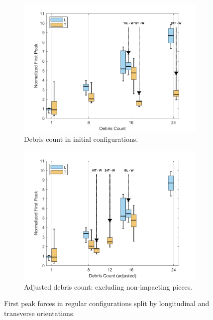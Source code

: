 \documentclass{article}
\begin{document}
\begin{figure}[htbp]
    \centering
    \begin{subfigure}[t]{0.9\textwidth}
        \centering
        \includegraphics[width=\textwidth]{FirstPeak_Regular_SplitByTrial.png}
        \caption{Debris count in initial configurations.}
        \label{fig:firstpeak_regular_original}
    \end{subfigure}
    \hfill
    \begin{subfigure}[t]{0.9\textwidth}
        \centering
        \includegraphics[width=\textwidth]{FirstPeak_Regular_RemappedT.png}
        \caption{Adjusted debris count: excluding non-impacting pieces.}
        \label{fig:firstpeak_regular_remap}
    \end{subfigure}
    \caption{First peak forces in regular configurations split by longitudinal and transverse orientations.}
    \label{fig:firstpeak_regular_split}
\end{figure}
\end{document}
